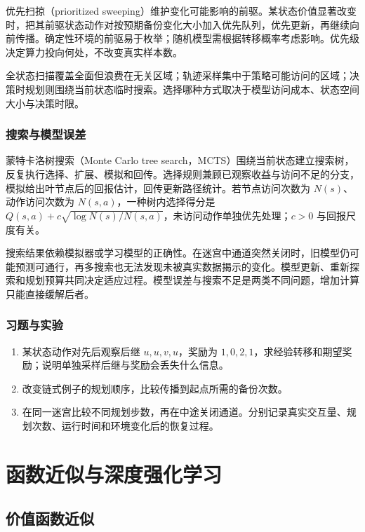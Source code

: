 \documentclass[UTF8,12pt,a4paper,fontset=fandol]{ctexbook}
\begin{document}
优先扫掠（prioritized sweeping）维护变化可能影响的前驱。某状态价值显著改变时，把其前驱状态动作对按预期备份变化大小加入优先队列，优先更新，再继续向前传播。确定性环境的前驱易于枚举；随机模型需根据转移概率考虑影响。优先级决定算力投向何处，不改变真实样本数。

全状态扫描覆盖全面但浪费在无关区域；轨迹采样集中于策略可能访问的区域；决策时规划则围绕当前状态临时搜索。选择哪种方式取决于模型访问成本、状态空间大小与决策时限。

\section{搜索与模型误差}

蒙特卡洛树搜索（Monte Carlo tree search，MCTS）围绕当前状态建立搜索树，反复执行选择、扩展、模拟和回传。选择规则兼顾已观察收益与访问不足的分支，模拟给出叶节点后的回报估计，回传更新路径统计。若节点访问次数为 $N(s)$、动作访问次数为 $N(s,a)$，一种树内选择得分是 $Q(s,a)+c\sqrt{\log N(s)/N(s,a)}$，未访问动作单独优先处理；$c>0$ 与回报尺度有关。

搜索结果依赖模拟器或学习模型的正确性。在迷宫中通道突然关闭时，旧模型仍可能预测可通行，再多搜索也无法发现未被真实数据揭示的变化。模型更新、重新探索和规划预算共同决定适应过程。模型误差与搜索不足是两类不同问题，增加计算只能直接缓解后者。

\section{习题与实验}
\begin{enumerate}
\item 某状态动作对先后观察后继 $u,u,v,u$，奖励为 $1,0,2,1$，求经验转移和期望奖励；说明单独采样后继与奖励会丢失什么信息。
\item 改变链式例子的规划顺序，比较传播到起点所需的备份次数。
\item 在同一迷宫比较不同规划步数，再在中途关闭通道。分别记录真实交互量、规划次数、运行时间和环境变化后的恢复过程。
\end{enumerate}

\part{函数近似与深度强化学习}

\chapter{价值函数近似}
\label{ch:rl-approximation}
\end{document}
